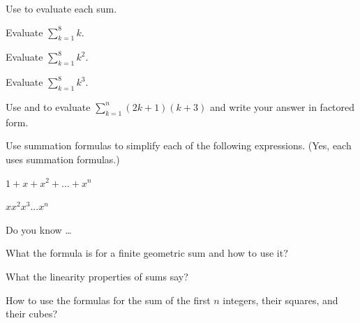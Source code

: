 \begin{exer}[\exerP] %
\label{exer_eval_sum_formulas_polys}
    Use  to evaluate each sum.
        \begin{exerpart}
            \item Evaluate $\displaystyle \sum_{k=1}^{8}k$.
            \item Evaluate $\displaystyle \sum_{k=1}^{8}k^2$.
            \item Evaluate $\displaystyle \sum_{k=1}^{8}k^3$.
        \end{exerpart}
\end{exer}

\begin{exer}[\exerU] %
\label{exer_using_sum_formulas_polys_lin}
     Use  and  to evaluate $\displaystyle \sum_{k=1}^n(2k+1)(k+3)$ and write your answer in factored form.  
\end{exer}

\begin{exer}[\exerU] %
\label{exer_sum_prod_powersofx}
    Use summation formulas to simplify each of the following expressions. (Yes, each uses summation formulas.)  
        \begin{exerpart}
            \item $1 + x + x^2 + \ldots + x^n$
            \item $xx^2x^3...x^n$
        \end{exerpart}
\end{exer}

\begin{exer}[\exerR] %
\label{exer_dyk_special_sums}
    Do you know \ldots
        \begin{exerpart}
            \item What the formula is for a finite geometric sum and how to use it?
            \item What the linearity properties of sums say?
            \item How to use the formulas for the sum of the first $n$ integers, their squares, and their cubes?
        \end{exerpart}
\end{exer}

